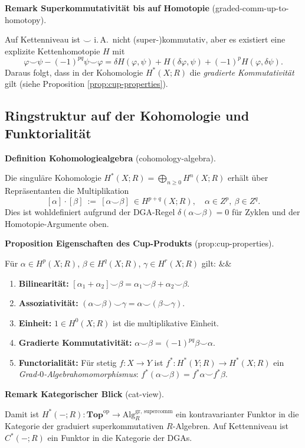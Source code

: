 \documentclass[10pt, letterpaper]{article}
\newcommand{\Alg}{\mathrm{Alg}}
\newenvironment{romanenum}[1][]
  {%
    \ifx&#1&
    \else
      \textbf{#1}\quad
    \fi
    \begin{enumerate}[label=\roman*)]
  }
  {%
    \end{enumerate}%
  }
\newcommand{\CustomHeading}[3]{%
  \par\medskip\noindent%
  \textbf{#1 #2} \textnormal{(#3)}.\enskip%
}
\newenvironment{DEF}[2]{\begin{unitbox}\CustomHeading{Definition}{#1}{#2}}{\end{unitbox}}
\newenvironment{PROP}[2]{\begin{unitbox}\CustomHeading{Proposition}{#1}{#2}}{\end{unitbox}}
\newenvironment{REM}[2]{\begin{unitbox}\CustomHeading{Remark}{#1}{#2}}{\end{unitbox}}
\begin{document}
\begin{REM}{Superkommutativität bis auf Homotopie}{graded-comm-up-to-homotopy}
Auf Kettenniveau ist \(\smile\) i.\,A.\ nicht (super-)kommutativ, aber es existiert eine explizite Kettenhomotopie \(H\) mit
\[
\varphi\smile\psi-(-1)^{pq}\psi\smile\varphi=\delta H(\varphi,\psi)+H(\delta\varphi,\psi)+(-1)^p H(\varphi,\delta\psi).
\]
Daraus folgt, dass in der Kohomologie \(H^\ast(X;R)\) die \emph{gradierte Kommutativität} gilt (siehe Proposition \ref{prop:cup-properties}).
\end{REM}

\subsection{Ringstruktur auf der Kohomologie und Funktorialität}

\begin{DEF}{Kohomologiealgebra}{cohomology-algebra}
Die singuläre Kohomologie \(H^\ast(X;R)=\bigoplus_{n\ge 0}H^n(X;R)\) erhält über Repräsentanten die Multiplikation
\[
[\alpha]\cdot[\beta]\ :=\ [\alpha\smile\beta]\ \in H^{p+q}(X;R),
\quad \alpha\in Z^p,\ \beta\in Z^q.
\]
Dies ist wohldefiniert aufgrund der DGA-Regel \(\delta(\alpha\smile\beta)=0\) für Zyklen und der Homotopie-Argumente oben.
\end{DEF}

\begin{PROP}{Eigenschaften des Cup-Produkts}{prop:cup-properties}
Für \(\alpha\in H^p(X;R)\), \(\beta\in H^q(X;R)\), \(\gamma\in H^r(X;R)\) gilt:
\begin{romanenum}
\item \textbf{Bilinearität:} \([\alpha_1+\alpha_2]\smile\beta=\alpha_1\smile\beta+\alpha_2\smile\beta\).
\item \textbf{Assoziativität:} \((\alpha\smile\beta)\smile\gamma=\alpha\smile(\beta\smile\gamma)\).
\item \textbf{Einheit:} \(1\in H^0(X;R)\) ist die multiplikative Einheit.
\item \textbf{Gradierte Kommutativität:} \(\alpha\smile\beta=(-1)^{pq}\beta\smile\alpha\).
\item \textbf{Functorialität:} Für stetig \(f:X\to Y\) ist \(f^\ast:H^\ast(Y;R)\to H^\ast(X;R)\) ein \emph{Grad-\(0\)-Algebrahomomorphismus}:
\(f^\ast(\alpha\smile\beta)=f^\ast\alpha\smile f^\ast\beta\).
\end{romanenum}
\end{PROP}

\begin{REM}{Kategorischer Blick}{cat-view}
Damit ist \(H^\ast(-;R):\mathbf{Top}^{\mathrm{op}}\to \Alg_R^{\mathrm{gr,\,supercomm}}\) ein kontravarianter Funktor in die Kategorie der graduiert superkommutativen \(R\)-Algebren. Auf Kettenniveau ist \(C^\ast(-;R)\) ein Funktor in die Kategorie der DGAs.
\end{REM}
\end{document}
